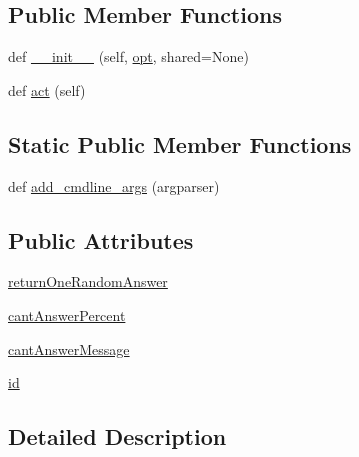 \subsection*{Public Member Functions}
\begin{DoxyCompactItemize}
\item 
def \hyperlink{classparlai_1_1agents_1_1repeat__label_1_1repeat__label_1_1RepeatLabelAgent_ad2a5f628b5ae8d7a6798ef2646d53111}{\+\_\+\+\_\+init\+\_\+\+\_\+} (self, \hyperlink{classparlai_1_1core_1_1agents_1_1Agent_ab3b45d2754244608c75d4068b90cd051}{opt}, shared=None)
\item 
def \hyperlink{classparlai_1_1agents_1_1repeat__label_1_1repeat__label_1_1RepeatLabelAgent_adf5c764bc7ad29787ec7c82646450fed}{act} (self)
\end{DoxyCompactItemize}
\subsection*{Static Public Member Functions}
\begin{DoxyCompactItemize}
\item 
def \hyperlink{classparlai_1_1agents_1_1repeat__label_1_1repeat__label_1_1RepeatLabelAgent_a8b226276eb5fee84571f4dc84d967aa3}{add\+\_\+cmdline\+\_\+args} (argparser)
\end{DoxyCompactItemize}
\subsection*{Public Attributes}
\begin{DoxyCompactItemize}
\item 
\hyperlink{classparlai_1_1agents_1_1repeat__label_1_1repeat__label_1_1RepeatLabelAgent_a97ae22e8d6f0c58194ee3d92970918e7}{return\+One\+Random\+Answer}
\item 
\hyperlink{classparlai_1_1agents_1_1repeat__label_1_1repeat__label_1_1RepeatLabelAgent_a5885af67d30233a5825de7414d4244a1}{cant\+Answer\+Percent}
\item 
\hyperlink{classparlai_1_1agents_1_1repeat__label_1_1repeat__label_1_1RepeatLabelAgent_a761b9c11bf08499c0da88de5ec9fb406}{cant\+Answer\+Message}
\item 
\hyperlink{classparlai_1_1agents_1_1repeat__label_1_1repeat__label_1_1RepeatLabelAgent_a5899e38c5ac0dab28f9e19bd8e4de669}{id}
\end{DoxyCompactItemize}


\subsection{Detailed Description}



